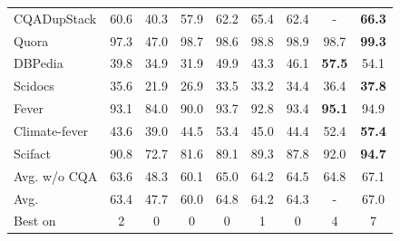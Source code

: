 \documentclass[10pt]{article} %
\begin{document}
\begin{table}[t!]
\begin{tabular}{@{}l  ccccccc >{\columncolor{bluegrey}}c}
CQADupStack     & 60.6          & 40.3          & 57.9          & 62.2          &  65.4         & 62.4          & -             & \textbf{66.3} \\
Quora           & 97.3          & 47.0          & 98.7          & 98.6          &  98.8         & 98.9          & 98.7          & \textbf{99.3} \\
DBPedia         & 39.8          & 34.9          & 31.9          & 49.9          &  43.3         & 46.1          & \textbf{57.5} & 54.1          \\
Scidocs         & 35.6          & 21.9          & 26.9          & 33.5          &  33.2         & 34.4          & 36.4          & \textbf{37.8} \\
Fever           & 93.1          & 84.0          & 90.0          & 93.7          &  92.8         & 93.4          & \textbf{95.1} & 94.9          \\
Climate-fever   & 43.6          & 39.0          & 44.5          & 53.4          &  45.0         & 44.4          & 52.4          & \textbf{57.4} \\
Scifact         & 90.8          & 72.7          & 81.6          & 89.1          &  89.3         & 87.8          & 92.0          & \textbf{94.7} \\
\midrule
Avg. w/o CQA    & 63.6          & 48.3          & 60.1          & 65.0          & 64.2          & 64.5          & 64.8          & 67.1 \\
Avg.            & 63.4          & 47.7          & 60.0          & 64.8          & 64.2          & 64.3          & -             & 67.0 \\
Best on         & 2             & 0             & 0             & 0             & 1             & 0             & 4             & 7             \\
\bottomrule
\end{tabular}%
\end{table}
\end{document}
